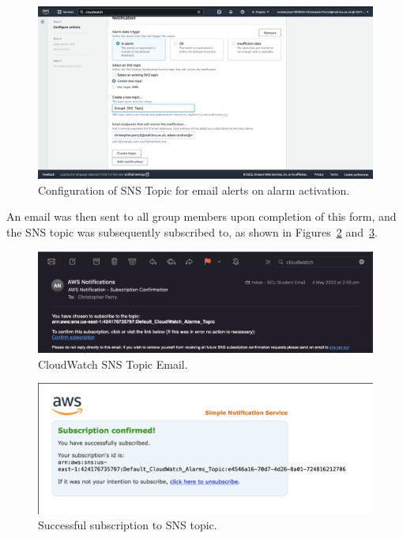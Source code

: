 \begin{figure}[!htbp]
    \centering
    \includegraphics[width=\textwidth]{resources/cloudwatch/cloudwatch-sns-topic}
    \caption{Configuration of SNS Topic for email alerts on alarm activation.}
    \label{fig:cloudwatch-sns-topic}
\end{figure}

An email was then sent to all group members upon completion of this form, and the SNS topic was subsequently subscribed
to, as shown in Figures~\ref{fig:cloudwatch-sns-email} and~\ref{fig:cloudwatch-sns-success}.

\begin{figure}[!htbp]
    \centering
    \includegraphics[width=\textwidth]{resources/cloudwatch/cloudwatch-email}
    \caption{CloudWatch SNS Topic Email.}
    \label{fig:cloudwatch-sns-email}
\end{figure}

\begin{figure}[!htbp]
    \centering
    \includegraphics[width=\textwidth]{resources/cloudwatch/cloudwatch-alarm-success}
    \caption{Successful subscription to SNS topic.}
    \label{fig:cloudwatch-sns-success}
\end{figure}

